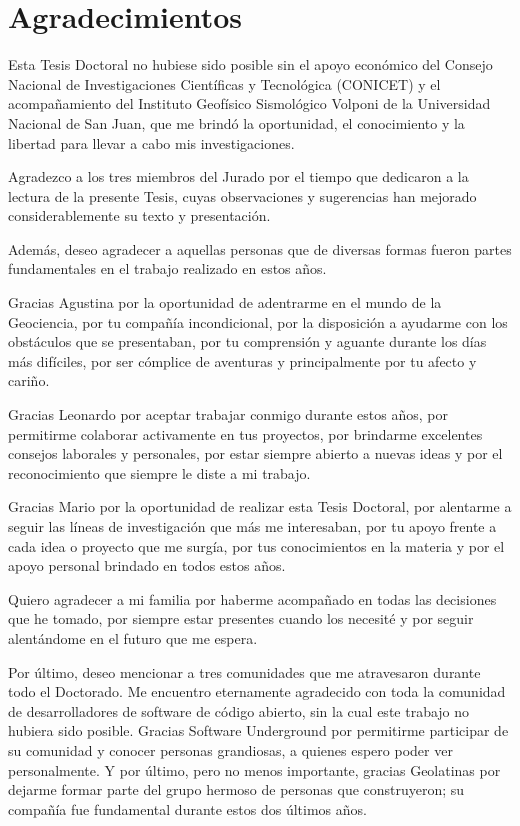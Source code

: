 \chapter{Agradecimientos}

Esta Tesis Doctoral no hubiese sido posible sin el apoyo económico del Consejo
Nacional de Investigaciones Científicas y Tecnológica (CONICET) y el
acompañamiento del Instituto Geofísico Sismológico Volponi de la Universidad
Nacional de San Juan, que me brindó la oportunidad, el conocimiento y la
libertad para llevar a cabo mis investigaciones.

Agradezco a los tres miembros del Jurado por el tiempo que dedicaron a la
lectura de la presente Tesis, cuyas observaciones y sugerencias han mejorado
considerablemente su texto y presentación.

Además, deseo agradecer a aquellas personas que de diversas formas fueron
partes fundamentales en el trabajo realizado en estos años.

Gracias Agustina por la oportunidad de adentrarme en el mundo de la Geociencia,
por tu compañía incondicional, por la disposición a ayudarme con los obstáculos
que se presentaban, por tu comprensión y aguante durante los días más
difíciles, por ser cómplice de aventuras y principalmente por tu afecto
y cariño.

Gracias Leonardo por aceptar trabajar conmigo durante estos años, por
permitirme colaborar activamente en tus proyectos, por brindarme excelentes
consejos laborales y personales, por estar siempre abierto a nuevas ideas y por
el reconocimiento que siempre le diste a mi trabajo.

Gracias Mario por la oportunidad de realizar esta Tesis Doctoral, por alentarme
a seguir las líneas de investigación que más me interesaban, por tu apoyo
frente a cada idea o proyecto que me surgía, por tus conocimientos en la
materia y por el apoyo personal brindado en todos estos años.

Quiero agradecer a mi familia por haberme acompañado en todas las decisiones
que he tomado, por siempre estar presentes cuando los necesité y por seguir
alentándome en el futuro que me espera.

Por último, deseo mencionar a tres comunidades que me atravesaron durante todo
el Doctorado.
Me encuentro eternamente agradecido con toda la comunidad de desarrolladores de
software de código abierto, sin la cual este trabajo no hubiera sido posible.
Gracias Software Underground por permitirme participar de su comunidad
y conocer personas grandiosas, a quienes espero poder ver personalmente.
Y por último, pero no menos importante, gracias Geolatinas por dejarme formar
parte del grupo hermoso de personas que construyeron; su compañía fue
fundamental durante estos dos últimos años.

